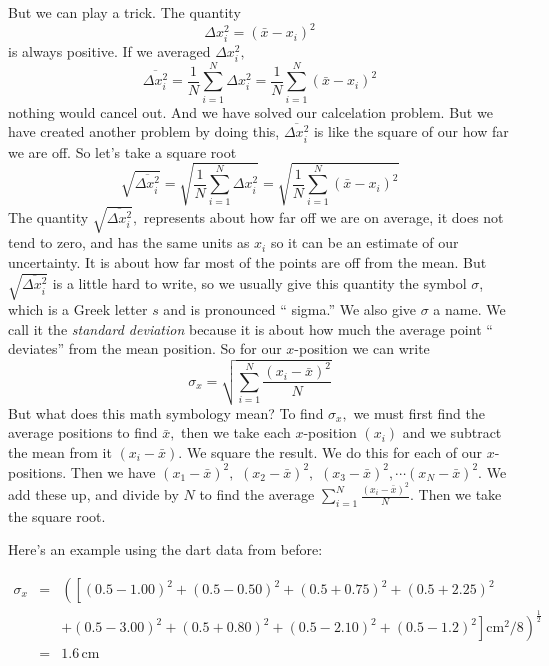\documentclass[twoside,11pt,ShortChapTitles]{BYUTextbook}
\begin{document}
But we can play a trick. The quantity
\[
\Delta x_{i}^{2}=\left( \bar{x}-x_{i}\right) ^{2}
\]%
is always positive. If we averaged $\Delta x_{i}^{2},$
\[
\overline{\Delta x_{i}^{2}}=\frac{1}{N}\sum_{i=1}^{N}\Delta x_{i}^{2}=\frac{1%
}{N}\sum_{i=1}^{N}\left( \bar{x}-x_{i}\right) ^{2}
\]%
nothing would cancel out. And we have solved our calcelation problem. But we
have created another problem by doing this, $\overline{\Delta x_{i}^{2}}$ is
like the square of our how far we are off. So let's take a square root%
\[
\sqrt{\overline{\Delta x_{i}^{2}}}=\sqrt{\frac{1}{N}\sum_{i=1}^{N}\Delta
x_{i}^{2}}=\sqrt{\frac{1}{N}\sum_{i=1}^{N}\left( \bar{x}-x_{i}\right) ^{2}}
\]%
The quantity $\sqrt{\overline{\Delta x_{i}^{2}}},$ represents about how far
off we are on average, it does not tend to zero, and has the same units as $%
x_{i}$ so it can be an estimate of our uncertainty. It is about how far most
of the points are off from the mean. But $\sqrt{\overline{\Delta x_{i}^{2}}}$
is a little hard to write, so we usually give this quantity the symbol $%
\sigma $, which is a Greek letter $s$ and is pronounced ``
sigma.'' We also give $\sigma $ a name. We call it the
\emph{standard deviation} because it is about how much the average point
`` deviates'' from the mean position. So for
our $x$-position we can write
\[
\sigma _{x}=\sqrt{\sum_{i=1}^{N}\frac{\left( x_{i}-\bar{x}\right) ^{2}}{N}}
\]%
But what does this math symbology mean? To find $\sigma _{x},$ we must first
find the average positions to find $\bar{x},$ then we take each $x$-position
$\left( x_{i}\right) $ and we subtract the mean from it $\left( x_{i}-\bar{x}%
\right) .$ We square the result. We do this for each of our $x$-positions.
Then we have $\left( x_{1}-\bar{x}\right) ^{2},$ $\left( x_{2}-\bar{x}%
\right) ^{2},$ $\left( x_{3}-\bar{x}\right) ^{2},\cdots \left( x_{N}-\bar{x}%
\right) ^{2}.$ We add these up, and divide by $N$ to find the average $%
\sum_{i=1}^{N}\frac{\left( x_{i}-\bar{x}\right) ^{2}}{N}.$ Then we take the
square root.

Here's an example using the dart data from before:

\begin{eqnarray*}
\sigma _{x}&=&\left(\left[ \left(0.5-1.00\right)^2+\left(0.5-0.50\right)^2+\left(0.5+0.75\right)^2+\left(0.5+2.25\right)^2\right.\right.\\
&&\left.\left.+\left(0.5-3.00\right)^2+\left(0.5+0.80\right)^2+\left(0.5-2.10\right)^2+\left(0.5-1.2\right)^2\right]\text{cm}^2/8\right)^{\tfrac{1}{2}}\\
&=&1.6\,\text{cm}
\end{eqnarray*}%
\end{document}
